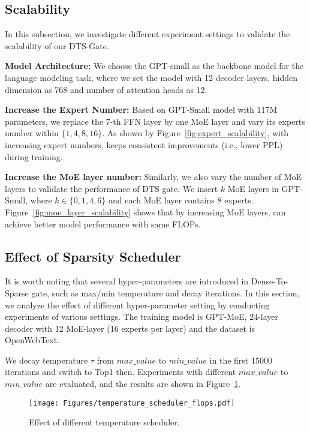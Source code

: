 \subsection{Scalability}

In this subsection, we investigate different experiment settings to validate the scalability of our DTS-Gate. 

\textbf{Model Architecture:} We choose the GPT-small as the backbone model for the language modeling task, where we set the model with 12 decoder layers, hidden dimension as 768 and number of attention heads as 12. 

\textbf{Increase the Expert Number:} Based on GPT-Small model with 117M parameters, we replace the 7-th FFN layer by one MoE layer and vary its experts number within $\{1, 4, 8, 16\}$. 
As shown by Figure~\ref{fig:expert_scalability}, with increasing expert numbers, \ourmethods{} keeps consistent improvements (i.e., lower PPL) during training.

\textbf{Increase the MoE layer number:} Similarly, we also vary the number of MoE layers to validate the performance of DTS gate. 
We insert $k$ MoE layers in GPT-Small, where $k \in \{0, 1, 4, 6\}$ and each MoE layer contains 8 experts. 
Figure~\ref{fig:moe_layer_scalability} shows that by increasing MoE layers, \ourmethods{} can achieve better model performance with same FLOPs. 

\subsection{Effect of Sparsity Scheduler}

It is worth noting that several hyper-parameters are introduced in Dense-To-Sparse gate, such as max/min temperature and decay iterations.
In this section, we analyze the effect of different hyper-parameter setting by conducting  experiments of various settings. The training model is GPT-MoE, 24-layer decoder with 12 MoE-layer (16 experts per layer) and the dataset is OpenWebText.

We decay temperature $\tau$ from $max\_value$ to $min\_value$ in the first 15000 iterations and switch to Top1 then. Experiments with different $max\_value$ to $min\_value$ are evaluated, and the results are shown in Figure~\ref{fig:scheduler}.

\begin{figure}[t]
    \centering
    \texttt{[image: Figures/temperature\_scheduler\_flops.pdf]}
    \caption{Effect of different temperature scheduler.}
    \label{fig:scheduler}
\end{figure}

